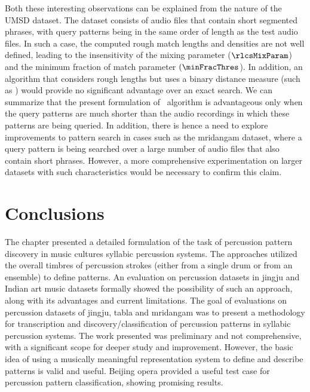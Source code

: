 Both these interesting observations can be explained from the nature of the \acrshort{UMSD} dataset. The dataset consists of audio files that contain short segmented phrases, with query patterns being in the same order of length as the test audio files. In such a case, the computed rough match lengths and densities are not well defined, leading to the insensitivity of the mixing parameter ($\rlcsMixParam$) and the minimum fraction of match parameter $(\minFracThres$). In addition, an algorithm that considers rough lengths but uses a binary distance measure (such as \rlcso) would provide no significant advantage over an exact search. We can summarize that the present formulation of \rlcso\ algorithm is advantageous only when the query patterns are much shorter than the audio recordings in which these patterns are being queried. In addition, there is hence a need to explore improvements to pattern search in cases such as the mridangam dataset, where a query pattern is being searched over a large number of audio files that also contain short phrases. However, a more comprehensive experimentation on larger datasets with such characteristics would be necessary to confirm this claim. 
\section{Conclusions}
The chapter presented a detailed formulation of the task of percussion pattern discovery in music cultures syllabic percussion systems. The approaches utilized the overall timbres of percussion strokes (either from a single drum or from an ensemble) to define patterns. An evaluation on percussion datasets in \gls{jingju} and Indian art music datasets formally showed the possibility of such an approach, along with its advantages and current limitations. The goal of evaluations on percussion datasets of \gls{jingju}, \gls{tabla} and mridangam was to present a methodology for transcription and discovery/classification of percussion patterns in syllabic percussion systems. The work presented was preliminary and not comprehensive, with a significant scope for deeper study and improvement. However, the basic idea of using a musically meaningful representation system to define and describe patterns is valid and useful. Beijing opera provided a useful test case for percussion pattern classification, showing promising results. 


